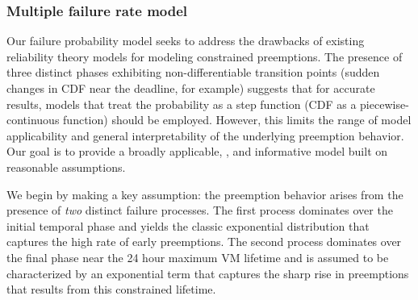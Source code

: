 \subsubsection{Multiple failure rate model}




Our failure probability model seeks to address the drawbacks of existing reliability theory models for modeling constrained preemptions. 
The presence of three distinct phases exhibiting non-differentiable transition points (sudden changes in CDF near the deadline, for example) suggests that for accurate results, models that treat the probability as a step function (CDF as a piecewise-continuous function) should be employed. However, this limits the range of model applicability and general interpretability of the underlying preemption behavior. Our goal is to provide a broadly applicable, , and informative model built on reasonable assumptions.  

We begin by making a key assumption: the preemption behavior arises from the presence of \emph{two} distinct failure processes.
The first process dominates over the initial temporal phase and yields the classic exponential distribution that captures the high rate of early preemptions.
The second process dominates over the final phase near the 24 hour maximum VM lifetime and is assumed to be characterized by an exponential term that captures the sharp rise in preemptions that results from this constrained lifetime. 

%
%


